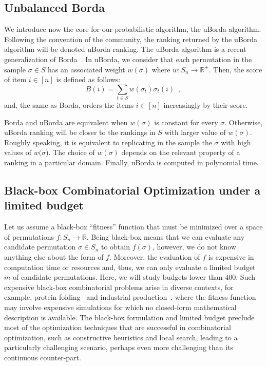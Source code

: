 \documentclass[sigconf,dvipsnames]{acmart}
\newcommand{\FEmax}{\ensuremath{m}}
\begin{document}
\subsection{Unbalanced Borda}\label{sec:uborda}
We introduce now the core for our probabilistic algorithm, the uBorda algorithm. Following the convention of the community, the ranking returned by the uBorda algorithm will be denoted uBorda ranking. The uBorda algorithm is a recent generalization of Borda~\cite{IruLobPer2020arxiv}. In uBorda, we consider that each permutation in the sample $\sigma\in S$ has an associated weight $w(\sigma)$ where $w\colon S_n \to \mathbb{R^{+}}$. Then, the score of item $i \in [n]$ is defined as follows:
%
\begin{equation}\label{eq:uborda_score}
B(i) =  \sum_{t\in S}  w(\sigma_t) \sigma_t(i) \enspace,
\end{equation}
%
and, the same as Borda, orders the items $i \in [n]$ increasingly by their score.

Borda and uBorda are equivalent when $w(\sigma)$ is constant for every $\sigma$. Otherwise, uBorda ranking will be closer to the rankings in $S$ with larger value of $w(\sigma)$. Roughly speaking, it is equivalent to replicating in the sample the $\sigma$ with high values of $w(\sigma$).
The choice of  $w(\sigma)$ depends on the relevant property of a ranking in a particular domain.
Finally, uBorda is computed in polynomial time.



\subsection{Black-box Combinatorial Optimization under a limited budget}

Let us assume a black-box ``fitness'' function that must be minimized over a
space of permutations $f\colon S_n \to \mathbb{R}$. Being black-box means that
we can evaluate any candidate permutation $\sigma \in S_n$ to obtain
$f(\sigma)$, however, we do not know anything else about the form of
$f$. Moreover, the evaluation of $f$ is expensive in computation time or
resources and, thus, we can only evaluate a limited budget $\FEmax$ of candidate
permutations. Here, we will study budgets lower than 400. Such expensive
black-box combinatorial problems arise in diverse contexts, for example,
protein folding~\citep{RomKraArn2012protein} and industrial
production~\citep{FerAlvDiaIglEna2014ants}, where the fitness function may
involve expensive simulations for which no closed-form mathematical description
is available. The black-box formulation and limited budget preclude most of the
optimization techniques that are successful in combinatorial optimization, such
as constructive heuristics and local search, leading to
a particularly challenging scenario, perhaps even more challenging than its continuous
counter-part.
\end{document}
